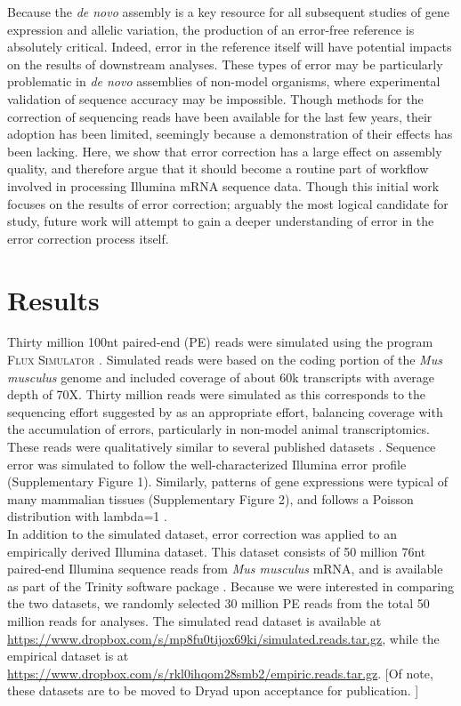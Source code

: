 \documentclass[11pt]{article}
\begin{document}
\noindent
Because the \textit{de novo} assembly is a key resource for all subsequent studies of gene expression and allelic variation, the production of an error-free reference is absolutely critical. Indeed, error in the reference itself will have potential impacts on the results of downstream analyses. These types of error may be particularly problematic in \textit{de novo} assemblies of non-model organisms, where experimental validation of sequence accuracy may be impossible. Though methods for the correction of sequencing reads have been available for the last few years, their adoption has been limited, seemingly because a demonstration of their effects has been lacking. Here, we show that error correction has a large effect on assembly quality, and therefore argue that it should become a routine part of workflow involved in processing Illumina mRNA sequence data. Though this initial work focuses on the results of error correction; arguably the most logical candidate for study, future work will attempt to gain a deeper understanding of error in the error correction process itself. \\

\section*{Results}
\noindent
Thirty million 100nt paired-end (PE) reads were simulated using the program \textsc{Flux Simulator} \citep{Griebel:2012ti}.  Simulated reads were based on the coding portion of the \textit{Mus musculus} genome and included coverage of about 60k transcripts with average depth of 70X. Thirty million reads were simulated as this corresponds to the sequencing effort suggested by \citep{Francis:2013gc} as an appropriate effort, balancing coverage with the accumulation of errors, particularly in non-model animal transcriptomics.  These reads were qualitatively similar to several published datasets \citep{MacManes:2012bu,Chen:2011ba}. Sequence error was simulated to follow the well-characterized Illumina error profile (Supplementary Figure 1).  Similarly, patterns of gene expressions were typical of many mammalian tissues (Supplementary Figure 2), and follows a Poisson distribution with lambda=1 \citep{Auer:2011bt,Hu:2011cn,Jiang:2009bw}.  \\

\noindent
In addition to the simulated dataset, error correction was applied to an empirically derived Illumina dataset. This dataset consists of 50 million 76nt paired-end Illumina sequence reads from \textit{Mus musculus} mRNA, and is available as part of the Trinity software package \citep{Haas:jq,Grabherr:2011jb}. Because we were interested in comparing the two datasets, we randomly selected 30 million PE reads from the total 50 million reads for analyses.  The simulated read dataset is available at \url{https://www.dropbox.com/s/mp8fu0tijox69ki/simulated.reads.tar.gz}, while the empirical dataset is at \url{https://www.dropbox.com/s/rkl0ihqom28smb2/empiric.reads.tar.gz}.  [Of note, these datasets are to be moved to Dryad upon acceptance for publication. ]\\
\end{document}
